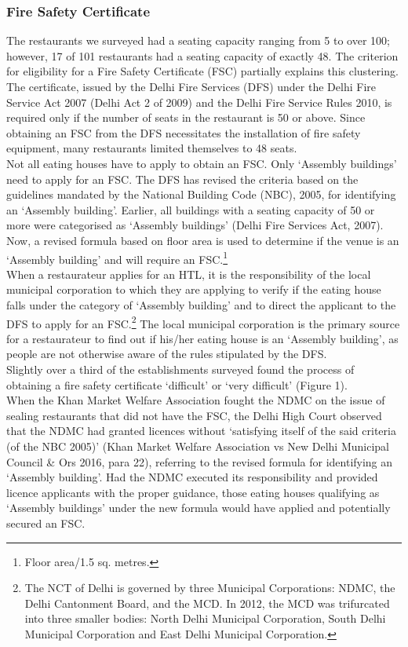 \documentclass[a4paper, 12pt]{article}
\begin{document}
		\subsubsection{Fire Safety Certificate}
		The restaurants we surveyed had a seating capacity ranging from 5 to over 100; however, 17 of 101 restaurants had a seating capacity of exactly 48. The criterion for eligibility for a Fire Safety Certificate (FSC) partially explains this clustering. The certificate, issued by the Delhi Fire Services (DFS) under the Delhi Fire Service Act 2007 (Delhi Act 2 of 2009) and the Delhi Fire Service Rules 2010, is required only if the number of seats in the restaurant is 50 or above. Since obtaining an FSC from the DFS necessitates the installation of fire safety equipment, many restaurants limited themselves to 48 seats.\\%
		Not all eating houses have to apply to obtain an FSC. Only ‘Assembly buildings’ need to apply for an FSC. The DFS has revised the criteria based on the guidelines mandated by the National Building Code (NBC), 2005, for identifying an ‘Assembly building’. Earlier, all buildings with a seating capacity of 50 or more were categorised as ‘Assembly buildings’ (Delhi Fire Services Act, 2007). Now, a revised formula based on floor area is used to determine if the venue is an ‘Assembly building’ and will require an FSC.\footnote{Floor area/1.5 sq. metres.} \\
		When a restaurateur applies for an HTL, it is the responsibility of the local municipal corporation to which they are applying to verify if the eating house falls under the category of ‘Assembly building’ and to direct the applicant to the DFS to apply for an FSC.\footnote{The NCT of Delhi is governed by three Municipal Corporations: NDMC, the Delhi Cantonment Board, and the MCD. In 2012, the MCD was trifurcated into three smaller bodies: North Delhi Municipal Corporation, South Delhi Municipal Corporation and East Delhi Municipal Corporation.} The local municipal corporation is the primary source for a restaurateur to find out if his/her eating house is an ‘Assembly building’, as people are not otherwise aware of the rules stipulated by the DFS. \\%
		Slightly over a third of the establishments surveyed found the process of obtaining a fire safety certificate ‘difficult’ or ‘very difficult’ (Figure 1). \\
		When the Khan Market Welfare Association fought the NDMC on the issue of sealing restaurants that did not have the FSC, the Delhi High Court observed that the NDMC had granted licences without ‘satisfying itself of the said criteria (of the NBC 2005)’ (Khan Market Welfare Association vs New Delhi Municipal Council \& Ors 2016, para 22), referring to the revised formula for identifying an ‘Assembly building’. Had the NDMC executed its responsibility and provided licence applicants with the proper guidance, those eating houses qualifying as ‘Assembly buildings’ under the new formula would have applied and potentially secured an FSC.%
\end{document}
